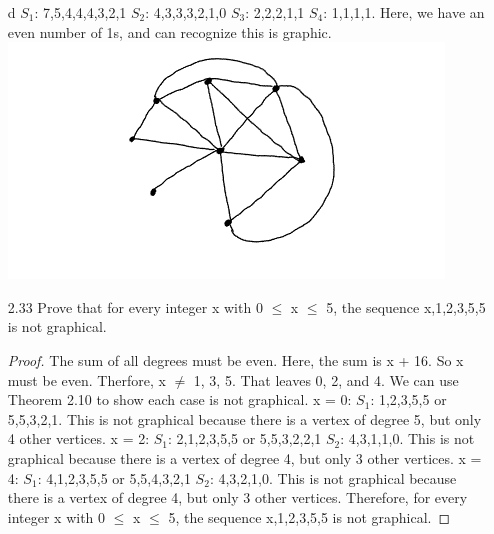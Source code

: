 \documentclass[12pt]{article}
\begin{document}
\begin{enumerate}
\item[d] 
    $S_1$: 7,5,4,4,4,3,2,1
    \newline
    $S_2$: 4,3,3,3,2,1,0
    \newline
    $S_3$: 2,2,2,1,1
    \newline
    $S_4$: 1,1,1,1. Here, we have an even number of 1s, and can recognize this is graphic.
    \newline
    \includegraphics{graphd.png}



\item[2.33] Prove that for every integer x with 0 $\leq$ x $\leq$ 5, the sequence x,1,2,3,5,5 is not graphical.
\begin{proof}
    The sum of all degrees must be even. Here, the sum is x + 16. So x must be even. Therfore, x $\neq$ 1, 3, 5.
    That leaves 0, 2, and 4. We can use Theorem 2.10 to show each case is not graphical.
    \newline
    x = 0:
    $S_1$: 1,2,3,5,5 or 5,5,3,2,1. This is not graphical because there is a vertex of degree 5, but only 4 other vertices.
    \newline
    x = 2:
    $S_1$: 2,1,2,3,5,5 or 5,5,3,2,2,1
    \newline
    $S_2$: 4,3,1,1,0. This is not graphical because there is a vertex of degree 4, but only 3 other vertices.
    \newline
    x = 4: 
    \newline
    $S_1$: 4,1,2,3,5,5 or 5,5,4,3,2,1    
    \newline
    $S_2$: 4,3,2,1,0. This is not graphical because there is a vertex of degree 4, but only 3 other vertices.
    \newline
    Therefore, for every integer x with 0 $\leq$ x $\leq$ 5, the sequence x,1,2,3,5,5 is not graphical. 
\end{proof} 


\end{enumerate}
\end{document}

